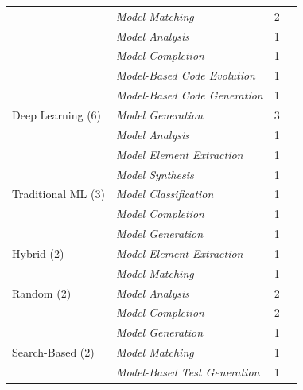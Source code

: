 \begin{tabular} {p{}  p{} p{} p{}}
 & \emph{Model Matching} & 2 & \cite{ \paperseventh,\papertwentieth }\\ 
 & \emph{Model Analysis} & 1 & \cite{ \paperonehundredfortyfirst }\\ 
 & \emph{Model Completion} & 1 & \cite{ \paperonehundredsixtieth }\\ 
 & \emph{Model-Based Code Evolution} & 1 & \cite{ \paperfortyfifth }\\ 
 & \emph{Model-Based Code Generation} & 1 & \cite{ \paperonehundredeighteenth }\\ 
\midrule  
Deep Learning (6) & \emph{Model Generation} & 3 & \cite{ \paperninetyeighth,\paperonehundredfifteenth,\paperonehundrednineteenth }\\ 
 & \emph{Model Analysis} & 1 & \cite{ \paperfirst }\\ 
 & \emph{Model Element Extraction} & 1 & \cite{ \paperthirtyninth }\\ 
 & \emph{Model Synthesis} & 1 & \cite{ \paperonehundredtwentysixth }\\ 
\midrule  
Traditional ML (3) & \emph{Model Classification} & 1 & \cite{ \paperonehundredthirtyseventh }\\ 
 & \emph{Model Completion} & 1 & \cite{ \papersixtyseventh }\\ 
 & \emph{Model Generation} & 1 & \cite{ \paperonehundredtwentyfifth }\\ 
\midrule  
Hybrid (2) & \emph{Model Element Extraction} & 1 & \cite{ \paperthirtyninth }\\ 
 & \emph{Model Matching} & 1 & \cite{ \paperseventh }\\ 
\midrule  
Random (2) & \emph{Model Analysis} & 2 & \cite{ \paperonehundredfortieth,\paperonehundredfortyfirst }\\ 
 & \emph{Model Completion} & 2 & \cite{ \paperonehundredfortieth,\paperonehundredfortyfirst }\\ 
 & \emph{Model Generation} & 1 & \cite{ \paperonehundredfortyfirst }\\ 
\midrule  
Search-Based (2) & \emph{Model Matching} & 1 & \cite{ \paperseventh }\\ 
 & \emph{Model-Based Test Generation} & 1 & \cite{ \paperthird }\\ 
\bottomrule 
\end{tabular} 
